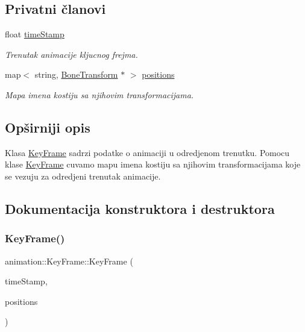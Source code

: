 \subsection*{Privatni članovi}
\begin{DoxyCompactItemize}
\item 
float \hyperlink{classanimation_1_1KeyFrame_ab8aa2370d72822b00f0528c69b9a5932}{time\+Stamp}
\begin{DoxyCompactList}\small\item\em Trenutak animacije kljucnog frejma. \end{DoxyCompactList}\item 
map$<$ string, \hyperlink{classanimation_1_1BoneTransform}{Bone\+Transform} $\ast$ $>$ \hyperlink{classanimation_1_1KeyFrame_a8e01baabf041ee027a0166670ad30e96}{positions}
\begin{DoxyCompactList}\small\item\em Mapa imena kostiju sa njihovim transformacijama. \end{DoxyCompactList}\end{DoxyCompactItemize}


\subsection{Opširniji opis}
Klasa \hyperlink{classanimation_1_1KeyFrame}{Key\+Frame} sadrzi podatke o animaciji u odredjenom trenutku. Pomocu klase \hyperlink{classanimation_1_1KeyFrame}{Key\+Frame} cuvamo mapu imena kostiju sa njihovim transformacijama koje se vezuju za odredjeni trenutak animacije. 

\subsection{Dokumentacija konstruktora i destruktora}
\mbox{\label{classanimation_1_1KeyFrame_ad294322ab993c5d93d3447cf10be0005}} 
\subsubsection{\texorpdfstring{Key\+Frame()}{KeyFrame()}}
{\footnotesize\ttfamily animation\+::\+Key\+Frame\+::\+Key\+Frame (\begin{DoxyParamCaption}\item[{float}]{time\+Stamp,  }\item[{map$<$ string, \hyperlink{classanimation_1_1BoneTransform}{Bone\+Transform} $\ast$$>$}]{positions }\end{DoxyParamCaption})}



